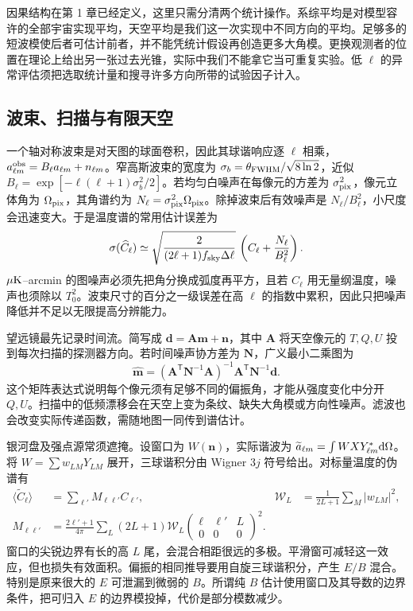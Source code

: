 因果结构在第 1 章已经定义，这里只需分清两个统计操作。系综平均是对模型容许的全部宇宙实现平均，天空平均是我们这一次实现中不同方向的平均。足够多的短波模使后者可估计前者，并不能凭统计假设再创造更多大角模。更换观测者的位置在理论上给出另一张过去光锥，实际中我们不能拿它当可重复实验。低 $\ell$ 的异常评估须把选取统计量和搜寻许多方向所带的试验因子计入。

\subsection{波束、扫描与有限天空}

一个轴对称波束是对天图的球面卷积，因此其球谐响应逐 $\ell$ 相乘，$a_{\ell m}^{\rm obs}=B_\ell a_{\ell m}+n_{\ell m}$。窄高斯波束的宽度为 $\sigma_b=\theta_{\rm FWHM}/\sqrt{8\ln2}$，近似 $B_\ell=\exp[-\ell(\ell+1)\sigma_b^2/2]$。若均匀白噪声在每像元的方差为 $\sigma_{\rm pix}^2$，像元立体角为 $\Omega_{\rm pix}$，其角谱约为 $N_\ell=\sigma_{\rm pix}^2\Omega_{\rm pix}$。除掉波束后有效噪声是 $N_\ell/B_\ell^2$，小尺度会迅速变大。于是温度谱的常用估计误差为
\[
 \sigma(\widehat C_\ell)\simeq
 \sqrt{\frac{2}{(2\ell+1)f_{\rm sky}\Delta\ell}}\,
                    \left(C_\ell+\frac{N_\ell}{B_\ell^2}\right).
\]
$\mu{\rm K}$--arcmin 的图噪声必须先把角分换成弧度再平方，且若 $C_\ell$ 用无量纲温度，噪声也须除以 $T_0^2$。波束尺寸的百分之一级误差在高 $\ell$ 的指数中累积，因此只把噪声降低并不足以无限提高分辨能力。

望远镜最先记录时间流。简写成 $\bm d=\bm A\bm m+\bm n$，其中 $\bm A$ 将天空像元的 $T,Q,U$ 投到每次扫描的探测器方向。若时间噪声协方差为 $\bm N$，广义最小二乘图为
\[
 \widehat{\bm m}=(\bm A^\mathsf T\bm N^{-1}\bm A)^{-1}
                   \bm A^\mathsf T\bm N^{-1}\bm d .
\]
这个矩阵表达式说明每个像元须有足够不同的偏振角，才能从强度变化中分开 $Q,U$。扫描中的低频漂移会在天空上变为条纹、缺失大角模或方向性噪声。滤波也会改变实际传递函数，需随地图一同传到谱估计。

银河盘及强点源常须遮掩。设窗口为 $W(\bm n)$，实际谐波为 $\widetilde a_{\ell m}=\int W X Y_{\ell m}^*\dd\Omega$。将 $W=\sum w_{LM}Y_{LM}$ 展开，三球谐积分由 Wigner $3j$ 符号给出。对标量温度的伪谱有
\[
 \begin{aligned}
 \langle\widetilde C_\ell\rangle&=\sum_{\ell'}M_{\ell\ell'}C_{\ell'},&
 \mathcal W_L&=\frac{1}{2L+1}\sum_M|w_{LM}|^2,\\
 M_{\ell\ell'}&=\frac{2\ell'+1}{4\pi}
  \sum_L(2L+1)\mathcal W_L
  \begin{pmatrix}\ell&\ell'&L\\0&0&0\end{pmatrix}^{\!2}.
 \end{aligned}
\]
窗口的尖锐边界有长的高 $L$ 尾，会混合相距很远的多极。平滑窗可减轻这一效应，但也损失有效面积。偏振的相同推导要用自旋三球谐积分，产生 $E/B$ 混合。特别是原来很大的 $E$ 可泄漏到微弱的 $B$。所谓纯 $B$ 估计使用窗口及其导数的边界条件，把可归入 $E$ 的边界模投掉，代价是部分模数减少。

